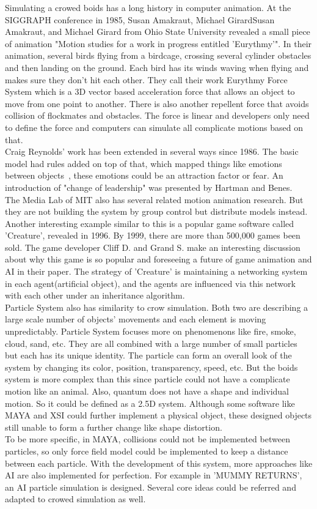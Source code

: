 Simulating a crowed boids has a long history in computer animation. At the SIGGRAPH conference in 1985, Susan Amakraut, Michael GirardSusan Amakraut, and Michael Girard from Ohio State University revealed a small piece of animation "Motion studies for a work in progress entitled 'Eurythmy'". \cite{1985}In their animation, several birds flying from a birdcage, crossing several cylinder obstacles and then landing on the ground. Each bird has its winds waving when flying and makes sure they don't hit each other. They call their work Eurythmy Force System which is a 3D vector based acceleration force that allows an object to move from one point to another. There is also another repellent force that avoids collision of flockmates and obstacles. The force is linear and developers only need to define the force and computers can simulate all complicate motions based on that.
\\
Craig Reynolds' work has been extended in several ways since 1986. The basic model had rules added on top of that, which mapped things like emotions between objects~\cite{Delgado:2007}, these emotions could be an attraction factor or fear. An introduction of "change of leadership" was presented by Hartman and Benes\cite{Hartman:2006}.\\
The Media Lab of MIT also has several related motion animation research. But they are not building the system by group control but distribute models instead.\cite{MIT} Another interesting example similar to this is a popular game software called 'Creature', revealed in 1996\cite{c_wiki}. By 1999, there are more than 500,000 games been sold. The game developer Cliff D. and Grand S. make an interesting discussion about why this game is so popular and foreseeing a future of game animation and AI in their paper. The strategy of 'Creature' is maintaining a networking system in each agent(artificial object), and the agents are influenced via this network with each other under an inheritance algorithm\cite{c_article}.\\
Particle System also has similarity to crow simulation. Both two are describing a large scale number of objects' movements and each element is moving unpredictably. Particle System focuses more on phenomenons like fire, smoke, cloud, sand, etc. They are all combined with a large number of small particles but each has its unique identity. The particle can form an overall look of the system by changing its color, position, transparency, speed, etc. But the boids system is more complex than this since particle could not have a complicate motion like an animal. Also, quantum does not have a shape and individual motion. So it could be defined as a 2.5D system. Although some software like MAYA and XSI \cite{maya}could further implement a physical object, these designed objects still unable to form a further change like shape distortion.\\
To be more specific, in MAYA, collisions could not be implemented between particles, so only force field model could be implemented to keep a distance between each particle. With the development of this system, more approaches like AI are also implemented for perfection. For example in 'MUMMY RETURNS'\cite{MR}, an AI particle simulation is designed. Several core ideas could be referred and adapted to crowed simulation as well.